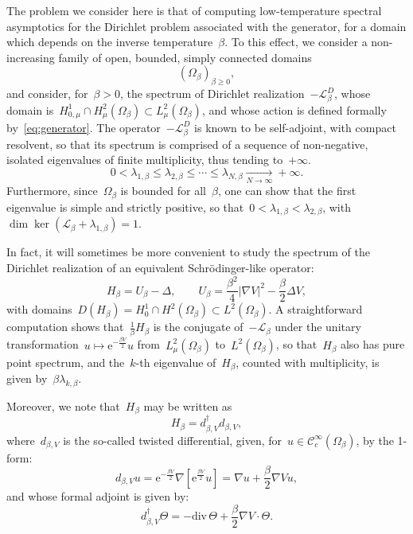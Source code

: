 \documentclass[10pt]{article}
\newcommand{\cL}{\mathcal{L}}
\newcommand{\e}{\mathrm{e}}
\renewcommand{\div}{\mathrm{div}}
\newcommand{\1}{\mathbbm 1}
\begin{document}
    The problem we consider here is that of computing low-temperature spectral asymptotics for the Dirichlet problem associated with the generator, for a domain which depends on the inverse temperature~$\beta$.
    To this effect, we consider a non-increasing family of open, bounded, simply connected domains
    \[(\Omega_\beta)_{\beta \geq 0},\]
    and consider, for~$\beta>0$, the spectrum of Dirichlet realization~$-\cL_\beta^D$, whose domain is~$H_{0,\mu}^1\cap H^2_{\mu}(\Omega_\beta) \subset L^2_\mu(\Omega_\beta)$,
    and whose action is defined formally by~\eqref{eq:generator}.
    The operator~$-\cL_\beta^D$ is known to be self-adjoint, with compact resolvent, so that its spectrum is comprised of a sequence of non-negative, isolated eigenvalues of finite multiplicity, thus tending to~$+\infty$.
   ~$$0<\lambda_{1,\beta} \leq \lambda_{2,\beta}\leq \dotsm \leq\lambda_{N,\beta} \underset{N\to\infty}{\longrightarrow}+\infty.$$
    Furthermore, since~$\Omega_\beta$ is bounded for all~$\beta$, one can show that the first eigenvalue is simple and strictly positive, so that~$0<\lambda_{1,\beta} < \lambda_{2,\beta}$, with~$\dim \ker \left(\cL_\beta+\lambda_{1,\beta}\right)=1$.

    In fact, it will sometimes be more convenient to study the spectrum of the Dirichlet realization of an equivalent Schrödinger-like operator:
    \begin{equation}
        \label{eq:witten_laplacian}
        H_{\beta} = U_\beta - \Delta,\qquad U_\beta = \frac{\beta^2}4|\nabla V|^2 - \frac{\beta}2 \Delta V,
    \end{equation}
    with domains~$D(H_\beta)=H_0^1\cap H^2(\Omega_\beta) \subset L^2(\Omega_\beta)$. A straightforward computation shows that~$\frac1{\beta}H_\beta$ is the conjugate of~$-\cL_\beta$ under the unitary transformation~$u\mapsto \e^{-\frac{\beta V}2}u$ from~$L_\mu^2(\Omega_\beta)$ to~$L^2(\Omega_\beta)$, so that~$H_\beta$ also has pure point spectrum, and the~$k$-th eigenvalue of~$H_\beta$, counted with multiplicity, is given by~$\beta\lambda_{k,\beta}$.

    Moreover, we note that~$H_\beta$ may be written as
    \begin{equation}
        \label{eq:factorization_witten}
        H_\beta = d_{\beta,V}^\dagger d_{\beta,V},
    \end{equation}
    where~$d_{\beta,V}$ is the so-called twisted differential, given, for~$u\in \mathcal C_c^\infty(\Omega_\beta)$, by the 1-form:
    \begin{equation}
        \label{eq:twisted_differential}
        d_{\beta,V}u = \e^{-\frac{\beta V}2}\nabla\left[\e^{\frac{\beta V}2}u\right] = \nabla u + \frac\beta 2\nabla V u,
    \end{equation}
    and whose formal adjoint is given by:
    \begin{equation}
        \label{eq:twisted_differential_adjoint}
        d_{\beta,V}^\dagger \Theta = -\div\, \Theta +\frac\beta 2 \nabla V \cdot \Theta.
    \end{equation}
\end{document}
